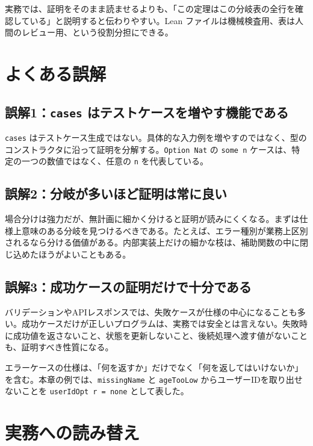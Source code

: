 \begin{softwarebox}
実務では、証明をそのまま読ませるよりも、「この定理はこの分岐表の全行を確認している」と説明すると伝わりやすい。Lean ファイルは機械検査用、表は人間のレビュー用、という役割分担にできる。
\end{softwarebox}

\section{よくある誤解}

\subsection{誤解1：\texttt{cases} はテストケースを増やす機能である}

\texttt{cases} はテストケース生成ではない。具体的な入力例を増やすのではなく、型のコンストラクタに沿って証明を分解する。\texttt{Option Nat} の \texttt{some n} ケースは、特定の一つの数値ではなく、任意の \texttt{n} を代表している。

\subsection{誤解2：分岐が多いほど証明は常に良い}

場合分けは強力だが、無計画に細かく分けると証明が読みにくくなる。まずは仕様上意味のある分岐を見つけるべきである。たとえば、エラー種別が業務上区別されるなら分ける価値がある。内部実装上だけの細かな枝は、補助関数の中に閉じ込めたほうがよいこともある。

\subsection{誤解3：成功ケースの証明だけで十分である}

バリデーションやAPIレスポンスでは、失敗ケースが仕様の中心になることも多い。成功ケースだけが正しいプログラムは、実務では安全とは言えない。失敗時に成功値を返さないこと、状態を更新しないこと、後続処理へ渡す値がないことも、証明すべき性質になる。

\begin{warningbox}
エラーケースの仕様は、「何を返すか」だけでなく「何を返してはいけないか」を含む。本章の例では、\texttt{missingName} と \texttt{ageTooLow} からユーザーIDを取り出せないことを \texttt{userIdOpt r = none} として表した。
\end{warningbox}

\section{実務への読み替え}

